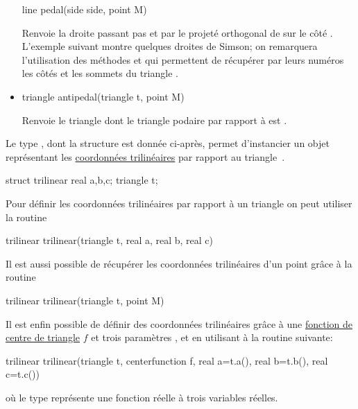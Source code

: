 \documentclass[pdftex]{article}
\begin{document}
\begin{itemize}
\begin{Vcolor}
    line pedal(side side, point M)
  \end{Vcolor}
  Renvoie la droite passant pas  et par le projeté
  orthogonal de  sur le côté .\\
  L'exemple suivant montre quelques droites de {\sc Simson}; on
  remarquera l'utilisation des méthodes  et
   qui permettent de récupérer par leurs numéros les
  côtés et les sommets du triangle .
\item {}
  \begin{Vcolor}
    triangle antipedal(triangle t, point M)
  \end{Vcolor}
  Renvoie le triangle dont le triangle podaire par rapport à 
  est .
\end{itemize}

Le type , dont la structure est donnée ci-après,
permet d'instancier un objet représentant les
\href{http://mathworld.wolfram.com/TrilinearCoordinates.html}{coordonnées
  trilinéaires} \shorthandoff{:}\shorthandon{:} par
rapport au triangle~.
\begin{center}
  \begin{Vcolor}
    struct trilinear
    {
      real a,b,c;
      triangle t;
    }
  \end{Vcolor}
\end{center}

Pour définir les coordonnées trilinéaires
\shorthandoff{:}\shorthandon{:} par rapport à un
triangle  on peut utiliser la routine
\begin{Vcolor}
  trilinear trilinear(triangle t, real a, real b, real c)
\end{Vcolor}
Il est aussi possible de récupérer les coordonnées trilinéaires d'un
point grâce à la routine
\begin{Vcolor}
  trilinear trilinear(triangle t, point M)
\end{Vcolor}
Il est enfin possible de définir des coordonnées trilinéaires grâce à
une
\href{http://mathworld.wolfram.com/TriangleCenterFunction.html}{fonction
  de centre de triangle} $f$ et trois
paramètres ,  et  en utilisant à la routine
suivante:
\begin{Vcolor}
  trilinear trilinear(triangle t, centerfunction f,
  real a=t.a(), real b=t.b(), real c=t.c())
\end{Vcolor}
\noindent où le type  représente une fonction
réelle à trois variables réelles.
\end{document}
